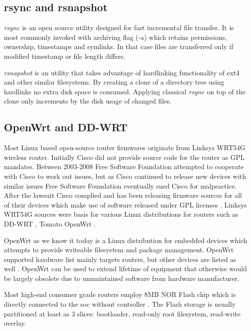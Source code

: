 \documentclass[a4paper,11pt]{kth-mag}
\begin{document}
\subsection{rsync and rsnapshot}

\emph{rsync} is an open source utility designed for
fast incremental file transfer.
It is most commonly invoked with archiving flag (-a) which
retains permissions, ownership, timestamps and symlinks.
In that case files are transferred only if
modified timestamp or file length differs.

\emph{rsnapshot} is an utility that takes advantage of hardlinking
functionality of \acrshort{ext4} and other similar filesystems.
By creating a clone of a directory tree using hardlinks no
extra disk space is consumed. Applying classical \emph{rsync} on top of
the clone only increments by the disk usage of changed files.


\subsection{OpenWrt and DD-WRT}

Most Linux based open-source router firmwares originate from
Linksys WRT54G wireless router.
Initially Cisco did not provide source code for the router as GPL mandates.
Between 2003-2008 Free Software Foundation attempted to cooperate
with Cisco to work out issues, but as Cisco continued to release
new devices with similar issues Free Software Foundation eventually
sued Cisco for malpractice.
After the lawsuit Cisco complied and has been releasing firmware
sources for all of their devices which make use of software
released under GPL licenses
\cite{fsf-vs-cisco}.
Linksys WRT54G sources were basis for various Linux distributions for routers such as
DD-WRT \cite{dd-wrt},
Tomato \cite{tomato}
OpenWrt \cite{openwrt}.

OpenWrt as we know it today is a Linux distribution for embedded devices
which attempts to provide writeable filesystem and package management.
OpenWrt supported hardware list mainly targets routers, but other devices are
listed as well \cite{openwrt-toh}. OpenWrt can be used to
extend lifetime of equipment that otherwise would be largely obsolete due
to unmaintained software from hardware manufacturer.

Most high-end consumer grade routers employ 8MB NOR Flash chip which is
directly connected to the \acrshort{soc} without controller
\cite{openwrt-flash-layout}.
The Flash storage is usually partitioned at least as 3 slices:
bootloader, read-only root filesystem, read-write overlay.
\end{document}
